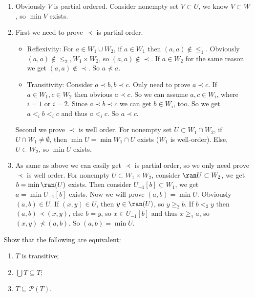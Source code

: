 \documentclass{ctexart}
\begin{document}
\begin{solution}
 \begin{enumerate}
  \item Obviously $V$ is partial ordered. Consider nonempty set $V\subset U$, we know $V\subset W$, so $\min V$ exists. 
  \item First we need to prove $\prec$ is partial order. 
  \begin{itemize}
   \item Reflexivity: For $a\in W_1\cup W_2$, if $a\in W_1$ then $(a,a)\notin \le_1$. Obviously $(a,a)\notin \le_2,W_1\times W_2$, so $(a,a)\notin \prec$. If $a\in W_2$ for the same reason we get $(a,a)\notin \prec$. So $a\not\prec a$. 
   \item Transitivity: Consider $a\prec b,b\prec c$. Only need to prove $a\prec c$. If $a\in W_1,c\in W_2$ then obvious $a\prec c$. So we can assume $a,c\in W_i$, where $i=1$ or $i=2$. Since $a\prec b\prec c$ we can get $b\in W_i$, too. So we get $a<_i b<_i c$ and thus $a<_i c$. So $a\prec c$. 
  \end{itemize}
  Second we prove $\prec$ is well order. For nonempty set $U\subset W_1\cap W_2$, if $U\cap W_1\neq \emptyset$, then $\min U=\min W_1\cap U$ exists ($W_1$ is well-order). Else, $U\subset W_2$, so $\min U$ exists. 
  \item As same as above we can easily get $\prec$ is partial order, so we only need prove $\prec$ is well order. For nonempty $U\subset W_1\times W_2$, 
  consider $\ran U\subset W_2$, we get $b=\min \ran(U)$ exists. Then consider $U_{-1}[b]\subset W_1$, 
  we get $a=\min U_{-1}[b]$ exists. Now we will prove $(a,b)=\min U$. Obviously $(a,b)\in U$. 
  If $(x,y)\in U$, then $y\in \ran(U)$, so $y\geq_2 b$. If $b<_2 y$ then $(a,b)\prec (x,y)$, 
  else $b=y$, so $x\in  U_{-1}[b]$ and thus $x\geq_1 a$, so $(x,y)\not\prec(a,b)$. So $(a,b)=\min U$. 
 \end{enumerate}
\end{solution}

\begin{problem}
 Show that the following are equivalent:
 \begin{enumerate}[ref=\theproblem.\arabic*]
  \item\label{it:1} $T$ is transitive;
  \item\label{it:2}$\bigcup T \subseteq T$;
  \item\label{it:3} $T \subseteq \mathscr{P}(T)$.
 \end{enumerate}
\end{problem}
\end{document}
